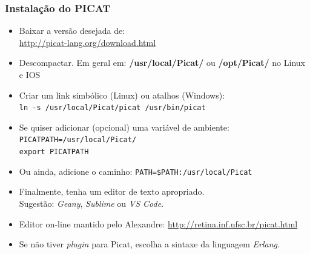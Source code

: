 \begin{frame}[fragile]
  \frametitle{Instalação do PICAT}

  \begin{itemize}
   	\item Baixar a versão desejada de:\\ 
    \hspace{8mm} \url{http://picat-lang.org/download.html}

     \pause    
   	\item Descompactar. Em geral em: \textbf{/usr/local/Picat/} ou \textbf{/opt/Picat/}  no Linux e IOS

     \pause    
    \item  Criar um link simbólico (Linux) ou atalhos (Windows):\\ 
    
   	\hspace{8mm}\texttt{ln -s /usr/local/Picat/picat   \hspace{3mm}   /usr/bin/picat}

    \pause    
    \item Se quiser adicionar (opcional) uma variável de ambiente:\\
          \hspace{8mm} \texttt{PICATPATH=/usr/local/Picat/}\\
          \hspace{8mm} \texttt{export PICATPATH}

     \pause
    \item Ou ainda, adicione o caminho: \texttt{PATH=\$PATH:/usr/local/Picat}

     \pause
   	\item Finalmente, tenha um editor de texto apropriado.\\
    \hspace{8mm} Sugestão: \textit{Geany}, \textit{Sublime} ou \textit{VS Code}.

  \pause
   	\item Editor on-line mantido pelo Alexandre: \url{http://retina.inf.ufsc.br/picat.html}
     
    \pause
    \item Se não tiver \textit{plugin} para Picat, escolha a sintaxe da linguagem \textit{Erlang}.
    
  \end{itemize}

\end{frame}


